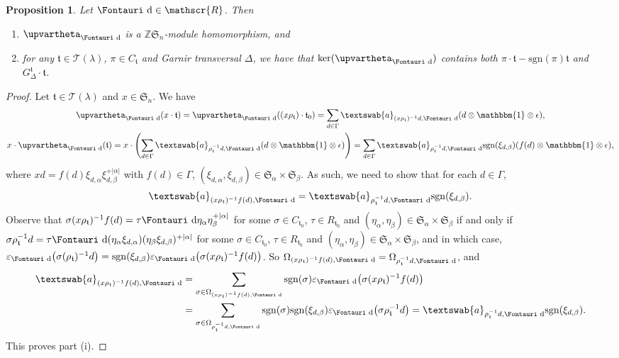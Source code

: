 \documentclass[pdftex]{sigma}
\newtheorem{Proposition}[Theorem]{Proposition}
 { \theoremstyle{definition}
\newtheorem{Definition}[Theorem]{Definition}
\newtheorem{Example}[Theorem]{Example}
\newtheorem{Remark}[Theorem]{Remark} }
\renewcommand{\t}{\mathfrak{t}}
\renewcommand{\a}{\textswab{a}}
\newcommand{\TT}{\mathscr{T}}
\newcommand{\sgn}{\mathrm{sgn}}
\newcommand{\sym}[1]{\mathfrak{S}_{#1}}
\newcommand{\bb}[1]{\mathbbm{{#1}}}
\newcommand{\R}{\mathscr{R}}
\newcommand{\dR}{\text{\Fontauri d}}
\newcommand{\e}{\varepsilon}
\newcommand{\Z}{\mathbb{Z}}
\newcommand{\Jhom}{\upvartheta}
\begin{document}
\begin{Proposition}\label{P: phi_d hom}
Let $\dR \in \R$. Then
\begin{enumerate}\itemsep=0pt
\item [$(i)$] $\Jhom_{\dR}$ is a $\Z \sym{n}$-module homomorphism, and
\item [$(ii)$] for any $\t \in \TT(\lambda)$, $\pi\in C_\t$ and Garnir transversal $\Delta$, we have that $\ker(\Jhom_{\dR})$ contains both $\pi \cdot \t - \sgn(\pi) \t$ and $G_{\Delta}^{\t} \cdot \t$.
\end{enumerate}
\end{Proposition}

\begin{proof} Let $\t \in \TT(\lambda)$ and $x \in \sym{n}$. We have
\begin{gather*}
\Jhom_{\dR}(x \cdot \t) = \Jhom_{\dR}((x \rho_{\t}) \cdot \t_0) = \sum_{d \in \Gamma} \a_{(x \rho_{\t})^{-1} d, \dR} (d \otimes \bb{1} \otimes \epsilon), \\
x \cdot \Jhom_{\dR} (\t) = x \cdot \left (\sum_{d \in \Gamma} \a_{\rho_{\t}^{-1} d, \dR} (d \otimes \bb{1} \otimes \epsilon)\right ) = \sum_{d \in \Gamma} \a_{\rho_{\t}^{-1} d, \dR} \sgn(\xi_{d,\beta}) (f(d) \otimes \bb{1} \otimes \epsilon),
\end{gather*}
where $xd = f(d) \xi_{d,\alpha} \xi_{d,\beta}^{+|\alpha|}$ with $f(d) \in \Gamma$, $(\xi_{d,\alpha},\xi_{d,\beta}) \in \sym{\alpha} \times \sym{\beta}$. As such, we need to show that for each $d \in \Gamma$,
\begin{gather*}
\a_{(x \rho_{\t})^{-1} f(d), \dR} = \a_{\rho_{\t}^{-1} d, \dR} \sgn(\xi_{d,\beta}).
\end{gather*}
Observe that $\sigma (x\rho_{\t})^{-1}f(d)=\tau \dR \eta_\alpha \eta_\beta^{+|\alpha|}$ for some $\sigma\in C_{\t_0}$, $\tau\in R_{\t_0}$ and $(\eta_\alpha,\eta_\beta)\in\sym{\alpha}\times \sym{\beta}$ if and only if $\sigma\rho_{\t}^{-1}d=\tau \dR (\eta_\alpha \xi_{d,\alpha}) (\eta_\beta\xi_{d,\beta})^{+|\alpha|}$ for some $\sigma\in C_{\t_0}$, $\tau\in R_{\t_0}$ and $(\eta_\alpha,\eta_\beta)\in\sym{\alpha}\times \sym{\beta}$, and in which case, $\e_{\dR}\big( \sigma (\rho_{\t})^{-1}d\big) = \sgn(\xi_{d,\beta}) \e_{\dR}\big(\sigma(x\rho_{\t})^{-1}f(d)\big)$. So $\Omega_{(x\rho_{\t})^{-1}f(d),\dR}=\Omega_{\rho_{\t}^{-1}d,\dR}$, and
\begin{align*}
\a_{(x\rho_{\t})^{-1} f(d),\dR} &= \sum_{\sigma\in \Omega_{(x\rho_{\t})^{-1}f(d),\dR}} \sgn(\sigma)\e_{\dR}\big(\sigma (x\rho_{\t})^{-1} f(d)\big)\\
&=\sum_{\sigma\in \Omega_{\rho_{\t}^{-1}d,\dR}} \sgn(\sigma)\sgn(\xi_{d,\beta})\e_{\dR}\big(\sigma \rho_{\t}^{-1}d\big)
=\a_{\rho_{\t}^{-1}d,\dR} \sgn(\xi_{d,\beta}).
\end{align*} This proves part (i).


\end{proof}
\end{document}
